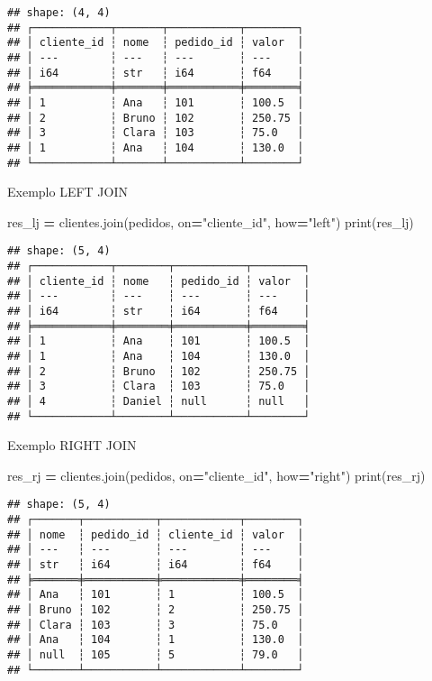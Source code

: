 \documentclass[
]{article}
\newenvironment{Shaded}{\begin{snugshade}}{\end{snugshade}}
\newcommand{\BuiltInTok}[1]{#1}
\newcommand{\NormalTok}[1]{#1}
\newcommand{\OperatorTok}[1]{\textcolor[rgb]{0.81,0.36,0.00}{\textbf{#1}}}
\newcommand{\StringTok}[1]{\textcolor[rgb]{0.31,0.60,0.02}{#1}}
\begin{document}
\begin{verbatim}
## shape: (4, 4)
## ┌────────────┬───────┬───────────┬────────┐
## │ cliente_id ┆ nome  ┆ pedido_id ┆ valor  │
## │ ---        ┆ ---   ┆ ---       ┆ ---    │
## │ i64        ┆ str   ┆ i64       ┆ f64    │
## ╞════════════╪═══════╪═══════════╪════════╡
## │ 1          ┆ Ana   ┆ 101       ┆ 100.5  │
## │ 2          ┆ Bruno ┆ 102       ┆ 250.75 │
## │ 3          ┆ Clara ┆ 103       ┆ 75.0   │
## │ 1          ┆ Ana   ┆ 104       ┆ 130.0  │
## └────────────┴───────┴───────────┴────────┘
\end{verbatim}

Exemplo LEFT JOIN

\begin{Shaded}
\begin{Highlighting}[]
\NormalTok{res\_lj }\OperatorTok{=}\NormalTok{ clientes.join(pedidos, on}\OperatorTok{=}\StringTok{"cliente\_id"}\NormalTok{, how}\OperatorTok{=}\StringTok{"left"}\NormalTok{) }
\BuiltInTok{print}\NormalTok{(res\_lj)}
\end{Highlighting}
\end{Shaded}

\begin{verbatim}
## shape: (5, 4)
## ┌────────────┬────────┬───────────┬────────┐
## │ cliente_id ┆ nome   ┆ pedido_id ┆ valor  │
## │ ---        ┆ ---    ┆ ---       ┆ ---    │
## │ i64        ┆ str    ┆ i64       ┆ f64    │
## ╞════════════╪════════╪═══════════╪════════╡
## │ 1          ┆ Ana    ┆ 101       ┆ 100.5  │
## │ 1          ┆ Ana    ┆ 104       ┆ 130.0  │
## │ 2          ┆ Bruno  ┆ 102       ┆ 250.75 │
## │ 3          ┆ Clara  ┆ 103       ┆ 75.0   │
## │ 4          ┆ Daniel ┆ null      ┆ null   │
## └────────────┴────────┴───────────┴────────┘
\end{verbatim}

Exemplo RIGHT JOIN

\begin{Shaded}
\begin{Highlighting}[]
\NormalTok{res\_rj }\OperatorTok{=}\NormalTok{ clientes.join(pedidos, on}\OperatorTok{=}\StringTok{"cliente\_id"}\NormalTok{, how}\OperatorTok{=}\StringTok{"right"}\NormalTok{) }
\BuiltInTok{print}\NormalTok{(res\_rj)}
\end{Highlighting}
\end{Shaded}

\begin{verbatim}
## shape: (5, 4)
## ┌───────┬───────────┬────────────┬────────┐
## │ nome  ┆ pedido_id ┆ cliente_id ┆ valor  │
## │ ---   ┆ ---       ┆ ---        ┆ ---    │
## │ str   ┆ i64       ┆ i64        ┆ f64    │
## ╞═══════╪═══════════╪════════════╪════════╡
## │ Ana   ┆ 101       ┆ 1          ┆ 100.5  │
## │ Bruno ┆ 102       ┆ 2          ┆ 250.75 │
## │ Clara ┆ 103       ┆ 3          ┆ 75.0   │
## │ Ana   ┆ 104       ┆ 1          ┆ 130.0  │
## │ null  ┆ 105       ┆ 5          ┆ 79.0   │
## └───────┴───────────┴────────────┴────────┘
\end{verbatim}
\end{document}
